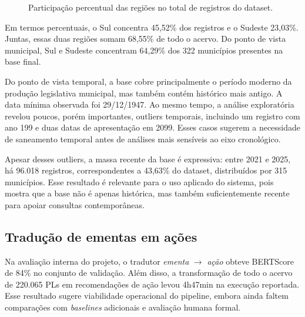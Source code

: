 \begin{figure}[H]
\centering
{}
\caption{Participação percentual das regiões no total de registros do dataset.}
\label{fig:regioes-v2}
\end{figure}

Em termos percentuais, o Sul concentra 45,52\% dos registros e o Sudeste 23,03\%. Juntas, essas duas regiões somam 68,55\% de todo o acervo. Do ponto de vista municipal, Sul e Sudeste concentram 64,29\% dos 322 municípios presentes na base final.

Do ponto de vista temporal, a base cobre principalmente o período moderno da produção legislativa municipal, mas também contém histórico mais antigo. A data mínima observada foi 29/12/1947. Ao mesmo tempo, a análise exploratória revelou poucos, porém importantes, outliers temporais, incluindo um registro com ano 199 e duas datas de apresentação em 2099. Esses casos sugerem a necessidade de saneamento temporal antes de análises mais sensíveis ao eixo cronológico.

Apesar desses outliers, a massa recente da base é expressiva: entre 2021 e 2025, há 96.018 registros, correspondentes a 43,63\% do dataset, distribuídos por 315 municípios. Esse resultado é relevante para o uso aplicado do sistema, pois mostra que a base não é apenas histórica, mas também suficientemente recente para apoiar consultas contemporâneas.

\subsection{Tradução de ementas em ações}

Na avaliação interna do projeto, o tradutor \textit{ementa} $\rightarrow$ \textit{ação} obteve BERTScore de 84\% no conjunto de validação. Além disso, a transformação de todo o acervo de 220.065 PLs em recomendações de ação levou 4h47min na execução reportada. Esse resultado sugere viabilidade operacional do pipeline, embora ainda faltem comparações com \textit{baselines} adicionais e avaliação humana formal.

